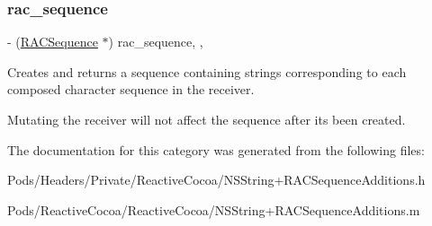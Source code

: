 \subsubsection{\texorpdfstring{rac\+\_\+sequence}{rac\_sequence}}
{\footnotesize\ttfamily -\/ (\mbox{\hyperlink{interface_r_a_c_sequence}{R\+A\+C\+Sequence}} $\ast$) rac\+\_\+sequence\hspace{0.3cm}{\ttfamily [read]}, {\ttfamily [nonatomic]}, {\ttfamily [copy]}}

Creates and returns a sequence containing strings corresponding to each composed character sequence in the receiver.

Mutating the receiver will not affect the sequence after it\textquotesingle{}s been created. 

The documentation for this category was generated from the following files\+:\begin{DoxyCompactItemize}
\item 
Pods/\+Headers/\+Private/\+Reactive\+Cocoa/N\+S\+String+\+R\+A\+C\+Sequence\+Additions.\+h\item 
Pods/\+Reactive\+Cocoa/\+Reactive\+Cocoa/N\+S\+String+\+R\+A\+C\+Sequence\+Additions.\+m\end{DoxyCompactItemize}
